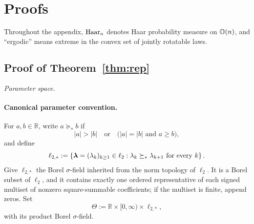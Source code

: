 \section{Proofs}
\label{supp:proofs}

Throughout the appendix, $\mathrm{Haar}_n$ denotes Haar probability measure on
$\mathbb{O}(n)$, and ``ergodic'' means extreme in the convex set of jointly
rotatable laws.

\subsection{Proof of Theorem~\ref{thm:rep}}

\emph{Parameter space.}
\paragraph{Canonical parameter convention.}
For \(a,b\in\mathbb R\), write \(a\succeq_*b\) if
\[
|a|>|b|
\quad\text{or}\quad
\bigl(|a|=|b|\text{ and }a\geq b\bigr),
\]
and define
\[
\ell_{2,*}
:=
\left\{
\bm{\lambda}=(\lambda_k)_{k\geq1}\in\ell_2:
\lambda_k\succeq_*\lambda_{k+1}
\text{ for every }k
\right\}.
\]
Give \(\ell_{2,*}\) the Borel \(\sigma\)-field inherited from the
norm topology of \(\ell_2\). It is a Borel subset of \(\ell_2\), and
it contains exactly one ordered representative of each signed
multiset of nonzero square-summable coefficients; if the multiset is
finite, append zeros. Set
\[
\Theta
:=
\mathbb R\times[0,\infty)\times\ell_{2,*},
\]
with its product Borel \(\sigma\)-field.

